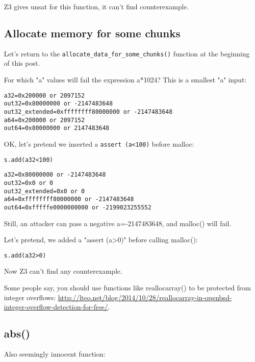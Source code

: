 Z3 gives unsat for this function, it can't find counterexample.

\subsection{Allocate memory for some chunks}

Let's return to the \verb|allocate_data_for_some_chunks()| function at the beginning of this post.



For which "a" values will fail the expression a*1024?
This is a smallest "a" input:

\begin{lstlisting}
a32=0x200000 or 2097152
out32=0x80000000 or -2147483648
out32_extended=0xffffffff80000000 or -2147483648
a64=0x200000 or 2097152
out64=0x80000000 or 2147483648
\end{lstlisting}

OK, let's pretend we inserted a \verb|assert (a<100)| before malloc:

\begin{lstlisting}
s.add(a32<100)
\end{lstlisting}

\begin{lstlisting}
a32=0x80000000 or -2147483648
out32=0x0 or 0
out32_extended=0x0 or 0
a64=0xffffffff80000000 or -2147483648
out64=0xfffffe0000000000 or -2199023255552
\end{lstlisting}

Still, an attacker can pass a negative a=-2147483648, and malloc() will fail.

Let's pretend, we added a "assert (a>0)" before calling malloc():

\begin{lstlisting}
s.add(a32>0)
\end{lstlisting}

Now Z3 can't find any counterexample.

Some people say, you should use functions like reallocarray() to be protected from integer overflows:
\url{http://lteo.net/blog/2014/10/28/reallocarray-in-openbsd-integer-overflow-detection-for-free/}.

\subsection{abs()}

Also seemingly innocent function:

